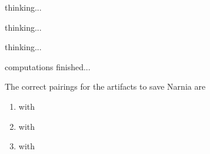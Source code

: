 \documentclass[white]{guildcamp3}
\begin{document}
\name{\wEndWorldFive{}} %

thinking...

thinking...

thinking...

computations finished...

The correct pairings for the artifacts to save Narnia are

\begin{enumerate}
	\item \iMagicArtifactThree{} with \iTechArtifactTwo{}

	\item \iMagicArtifactOne{} with \iTechArtifactThree{}

	\item \iMagicArtifactTwo{} with \iTechArtifactOne{}
\end{enumerate}

\end{document}
